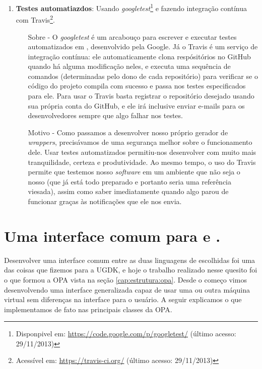 \begin{enumerate}
    \item \textbf{Testes automatiazdos}: Usando \textit{googletest}\footnote{Disponpivel
      em: \url{https://code.google.com/p/googletest/} (último acesso: 29/11/2013)} e
      fazendo integração contínua com Travis\footnote{Acessível em:
      \url{https://travis-ci.org/} (último acesso: 29/11/2013)}.
      \begin{itemize}
        \item[Sobre -] O \textit{googletest} é um arcabouço para escrever e
          executar testes automatizados em \CXX{}, desenvolvido pela Google.
          Já o Travis é um serviço de integração contínua: ele
          automaticamente clona respósitórios no GitHub quando há alguma
          modificação neles, e executa uma sequência de comandos (determinadas
          pelo dono de cada repositório) para verificar se o código do projeto
          compila com sucesso e passa nos testes especificados para ele. Para usar o
          Travis basta registrar o repositório desejado usando sua própria conta
          do GitHub, e ele irá inclusive enviar e-mails para os desenvolvedores
          sempre que algo falhar nos testes.
        \item[Motivo -] Como passamos a desenvolver nosso próprio gerador de
          \textit{wrappers}, precisávamos de uma segurança melhor sobre o
          funcionamento dele. Usar testes automatizados permitiu-nos desenvolver
          com muito mais tranquilidade, certeza e produtividade. Ao mesmo tempo,
          o uso do Travis permite que testemos nosso \textit{software} em
          um ambiente que não seja o nosso (que já está todo preparado e portanto
          seria uma referência viesada), assim como saber imediatamente quando
          algo parou de funcionar graças às notificações que ele nos envia.
      \end{itemize}
  \end{enumerate}
  
  \section{Uma interface comum para  e .}
  \label{sec:atividades:opa}
  Desenvolver uma interface comum entre as duas linguagens de \script{} escolhidas
  foi uma das coisas que fizemos para a UGDK, e hoje o trabalho realizado nesse
  quesito foi o que formou a OPA vista na seção \ref{cap:estrutura:opa}. Desde o
  começo vimos desenvolvendo uma interface generalizada capaz de usar uma ou outra
  máquina virtual sem diferenças na interface para o usuário. A seguir explicamos
  o que implementamos de fato nas principais classes da OPA.

